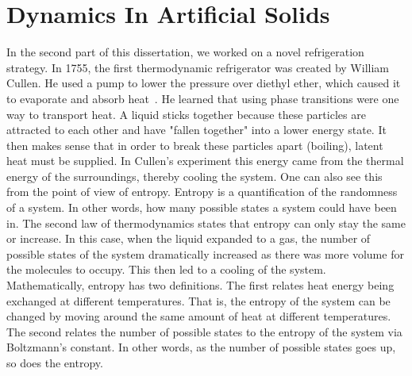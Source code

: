 \section{Dynamics In Artificial Solids}
In the second part of this dissertation, we worked on a novel refrigeration strategy. In 1755, the first thermodynamic refrigerator was created by William Cullen. He used a pump to lower the pressure over diethyl ether, which caused it to evaporate and absorb heat~\cite{Chandra??}. He learned that using phase transitions were one way to transport heat. A liquid sticks together because these particles are attracted to each other and have "fallen together" into a lower energy state. It then makes sense that in order to break these particles apart (boiling), latent heat must be supplied. In Cullen's experiment this energy came from the thermal energy of the surroundings, thereby cooling the system. One can also see this from the point of view of entropy. Entropy is a quantification of the randomness of a system. In other words, how many possible states a system could have been in. The second law of thermodynamics states that entropy can only stay the same or increase. In this case, when the liquid expanded to a gas, the number of possible states of the system dramatically increased as there was more volume for the molecules to occupy. This then led to a cooling of the system. 
	Mathematically, entropy has two definitions. The first relates heat energy being exchanged at different temperatures. That is, the entropy of the system can be changed by moving around the same amount of heat at different temperatures. The second relates the number of possible states to the entropy of the system via Boltzmann's constant. In other words, as the number of possible states goes up, so does the entropy.
